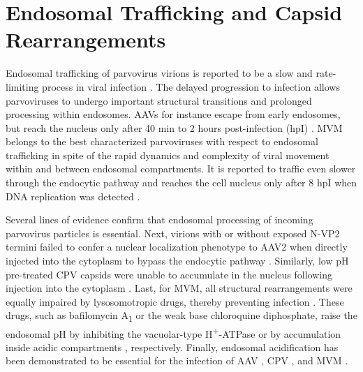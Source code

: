 \section{Endosomal Trafficking and Capsid Rearrangements}
\label{Rearrangements}
Endosomal trafficking of parvovirus virions is reported to be a slow and rate-limiting process in viral infection \cite{pmid10841516, pmid10623762, pmid11287557, pmid16379002}. The delayed progression to infection allows parvoviruses to undergo important structural transitions and prolonged processing within endosomes. AAVs for instance escape from early endosomes, but reach the nucleus only after 40 min to 2 hours post-infection (hpI) \cite{pmid10684294, pmid12388712}. MVM belongs to the best characterized parvoviruses with respect to endosomal trafficking in spite of the rapid dynamics and complexity of viral movement within and between endosomal compartments. It is reported to traffic even slower through the endocytic pathway and reaches the cell nucleus only after 8 hpI when DNA replication was detected \cite{pmid12438589}.       

Several lines of evidence confirm that endosomal processing of incoming parvovirus particles is essential. Next, virions with or without exposed N-VP2 termini failed to confer a nuclear localization phenotype to AAV2 when directly injected into the cytoplasm to bypass the endocytic pathway \cite{pmid16956943, pmid15829993}. Similarly, low pH pre-treated CPV capsids were unable to accumulate in the nucleus following injection into the cytoplasm \cite{pmid9420290}. Last, for MVM, all structural rearrangements were equally impaired by lysosomotropic drugs, thereby preventing infection \cite{pmid16379002, pmid12438589}. These drugs, such as bafilomycin A\textsubscript{1} or the weak base chloroquine diphosphate, raise the endosomal pH by inhibiting the vacuolar-type H\textsuperscript{+}-ATPase \cite{pmid2973058, pmid6094416, BafA1} or by accumulation inside acidic compartments \cite{pmid4606365, pmid28524, pmid6169733}, respectively. Finally, endosomal acidification has been demonstrated to be essential for the infection of AAV \cite{pmid10684294, pmid15681453, pmid11160681, pmid11287557}, CPV \cite{pmid10644365, pmid9420290, pmid1733094}, and MVM \cite{pmid16379002, pmid12438589}.  

